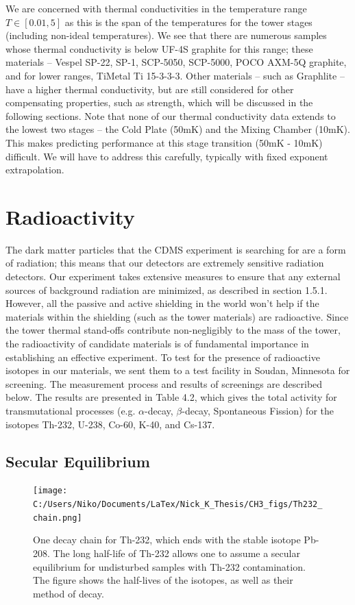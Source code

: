 \documentclass{report}
\begin{document}
We are concerned with thermal conductivities in the temperature range $T \in [0.01,5]$ as this is the span of the temperatures for the tower stages (including non-ideal temperatures). We see that there are numerous samples whose thermal conductivity is below UF-4S graphite for this range; these materials -- Vespel SP-22, SP-1, SCP-5050, SCP-5000, POCO AXM-5Q graphite, and for lower ranges, TiMetal Ti 15-3-3-3. Other materials -- such as Graphlite -- have a higher thermal conductivity, but are still considered for other compensating properties, such as strength, which will be discussed in the following sections. Note that none of our thermal conductivity data extends to the lowest two stages -- the Cold Plate (50mK) and the Mixing Chamber (10mK). This makes predicting performance at this stage transition (50mK - 10mK) difficult. We will have to address this carefully, typically with fixed exponent extrapolation.



\section{Radioactivity}

The dark matter particles that the CDMS experiment is searching for are a form of radiation; this means that our detectors are extremely sensitive radiation detectors. Our experiment takes extensive measures to ensure that any external sources of background radiation are minimized, as described in section 1.5.1. However, all the passive and active shielding in the world won't help if the materials within the shielding (such as the tower materials) are radioactive. Since the tower thermal stand-offs contribute non-negligibly to the mass of the tower, the radioactivity of candidate materials is of fundamental importance in establishing an effective experiment. To test for the presence of radioactive isotopes in our materials, we sent them to a test facility in Soudan, Minnesota for screening. The measurement process and results of screenings are described below. The results are presented in Table 4.2, which gives the total activity for transmutational processes (e.g. $\alpha$-decay, $\beta$-decay, Spontaneous Fission) for the isotopes Th-232, U-238, Co-60, K-40, and Cs-137.

\subsection{Secular Equilibrium}

\begin{figure}
\centering
\texttt{[image: C:/Users/Niko/Documents/LaTex/Nick\_K\_Thesis/CH3\_figs/Th232\_chain.png]}
\caption{One decay chain for Th-232, which ends with the stable isotope Pb-208. The long half-life of Th-232 allows one to assume a secular equilibrium for undisturbed samples with Th-232 contamination. The figure shows the half-lives of the isotopes, as well as their method of decay.}
\end{figure}
\end{document}
